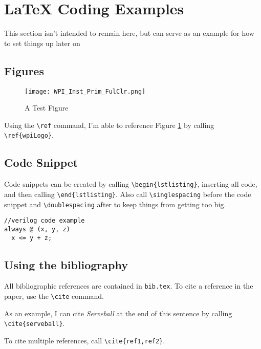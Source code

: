 \section*{LaTeX Coding Examples}
This section isn't intended to remain here, but can serve as an example for how to set things up later on

\subsection{Figures} 
\begin{figure}[H]
	\centerline{\texttt{[image: WPI\_Inst\_Prim\_FulClr.png]}}
	\caption{A Test Figure}
	\label{wpiLogo}
\end{figure}

Using the \verb!\ref! command, I'm able to reference Figure \ref{wpiLogo} by calling \verb!\ref{wpiLogo}!.

\subsection{Code Snippet}
Code snippets can be created by calling \verb!\begin{lstlisting}!, inserting all code, and then calling \verb!\end{lstlisting}!. Also call \verb!\singlespacing! before the code snippet and \verb!\doublespacing! after to keep things from getting too big.
\singlespacing %
\begin{lstlisting}
//verilog code example
always @ (x, y, z)
  x <= y + z;
\end{lstlisting}
\doublespacing %

\subsection{Using the bibliography}
All bibliographic references are contained in \texttt{bib.tex}. To cite a reference in the paper, use the \verb!\cite! command.
\par
As an example, I can cite \textit{Serveball} at the end of this sentence by calling \verb!\cite{serveball}!.\cite{serveball}
\par
To cite multiple references, call \verb!\cite{ref1,ref2}!.\cite{serveball,porikli}

